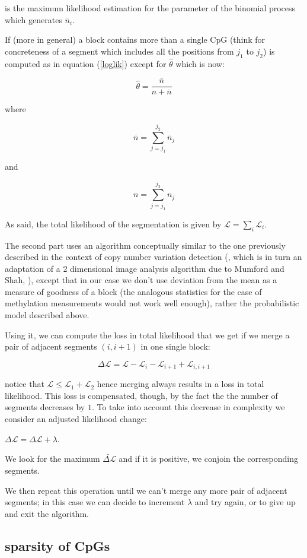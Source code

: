 \documentclass[11pt]{amsart}
\newcommand{\lik}{\ensuremath{\mathcal{L}}}
\begin{document}
is the maximum likelihood estimation for the parameter of the binomial process 
which generates $\overline{n}_i$.

If (more in general) a block contains  more than a single CpG  
(think for concreteness of a segment which includes all the positions from 
$j_1$ to $j_2$) is 
computed as in equation (\ref{loglik}) except for $\hat{\theta}$ which is now:

\[
\hat{\theta}=\frac{\overline{n}}{n + \overline{n}}
\]

where

\[
	\overline{n}=\sum_{j=j_1}^{j_2} \overline{n}_j
\]

and

\[
	n=\sum_{j=j_1}^{j_2} n_j
\]

As said, the total likelihood of the segmentation is given by 
$\mathcal{L}=\sum_i\mathcal{L}_i$.

The second part uses an  algorithm conceptually similar to the one 
previously described   in 
the context of copy number variation detection (\cite{vega}, which is in 
turn an adaptation 
of a 2 dimensional image analysis algorithm due to Mumford and Shah, 
\cite{mumfordshah}), except that in our case we don't use deviation from
the mean as a measure of goodness of a block (the analogous
statistics for the case of methylation measurements would not work well enough),
rather the probabilistic model described above.

Using it,  we can compute the loss in 
total likelihood that we get if we merge a pair of adjacent segments $(i,i+1)$ 
in one single block:

\[\Delta \lik=\lik-\mathcal{L}_i-\mathcal{L}_{i+1}+\mathcal{L}_{i,i+1}\]

notice that $\mathcal{L} \leq \mathcal{L}_1+\mathcal{L}_2$ hence merging always 
results in a loss in total 
likelihood. This loss is compensated, though, by the fact the the number 
of segments decreases by $1$. To take into account this decrease in 
complexity we consider an adjusted likelihood change:

$\Delta \lik = \Delta \lik+\lambda$.

We look for the maximum $\tilde{\Delta \lik}$ and if it is positive, we conjoin
the corresponding segments.

We then repeat this operation until we can't merge any more pair of adjacent 
segments; in this case we can decide to increment 
$\lambda$ and try again, or to give up and exit the algorithm.

\subsection{sparsity of CpGs}
\end{document}
